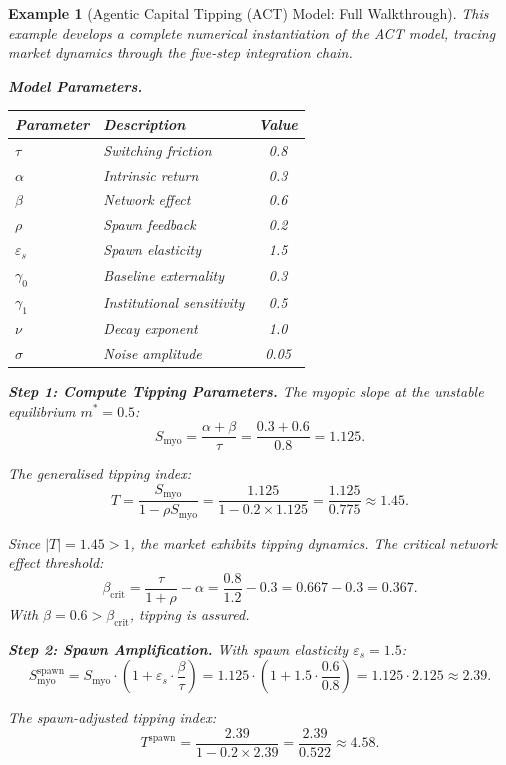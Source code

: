 \documentclass[12pt]{article}
\newtheorem{example}[theorem]{Example}
\begin{document}
\begin{example}[Agentic Capital Tipping (ACT) Model: Full Walkthrough]
\label{ex:act-full}
This example develops a complete numerical instantiation of the ACT model, tracing market dynamics through the five-step integration chain.

\textbf{Model Parameters.}
\begin{center}
\begin{tabular}{llc}
\toprule
\textbf{Parameter} & \textbf{Description} & \textbf{Value} \\
\midrule
$\tau$ & Switching friction & 0.8 \\
$\alpha$ & Intrinsic return & 0.3 \\
$\beta$ & Network effect & 0.6 \\
$\rho$ & Spawn feedback & 0.2 \\
$\varepsilon_s$ & Spawn elasticity & 1.5 \\
$\gamma_0$ & Baseline externality & 0.3 \\
$\gamma_1$ & Institutional sensitivity & 0.5 \\
$\nu$ & Decay exponent & 1.0 \\
$\sigma$ & Noise amplitude & 0.05 \\
\bottomrule
\end{tabular}
\end{center}

\textbf{Step 1: Compute Tipping Parameters.}
The myopic slope at the unstable equilibrium $m^* = 0.5$:
\[
S_{\text{myo}} = \frac{\alpha + \beta}{\tau} = \frac{0.3 + 0.6}{0.8} = 1.125.
\]

The generalised tipping index:
\[
T = \frac{S_{\text{myo}}}{1 - \rho S_{\text{myo}}} = \frac{1.125}{1 - 0.2 \times 1.125} = \frac{1.125}{0.775} \approx 1.45.
\]

Since $|T| = 1.45 > 1$, the market exhibits tipping dynamics. The critical network effect threshold:
\[
\beta_{\text{crit}} = \frac{\tau}{1 + \rho} - \alpha = \frac{0.8}{1.2} - 0.3 = 0.667 - 0.3 = 0.367.
\]
With $\beta = 0.6 > \beta_{\text{crit}}$, tipping is assured.

\textbf{Step 2: Spawn Amplification.}
With spawn elasticity $\varepsilon_s = 1.5$:
\[
S_{\text{myo}}^{\text{spawn}} = S_{\text{myo}} \cdot \left(1 + \varepsilon_s \cdot \frac{\beta}{\tau}\right) = 1.125 \cdot \left(1 + 1.5 \cdot \frac{0.6}{0.8}\right) = 1.125 \cdot 2.125 \approx 2.39.
\]

The spawn-adjusted tipping index:
\[
T^{\text{spawn}} = \frac{2.39}{1 - 0.2 \times 2.39} = \frac{2.39}{0.522} \approx 4.58.
\]


\end{example}
\end{document}
